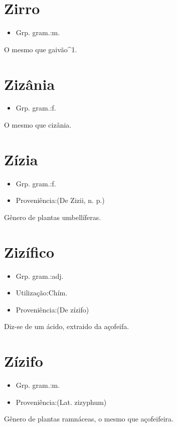\section{Zirro}
\begin{itemize}
\item {Grp. gram.:m.}
\end{itemize}
O mesmo que \textunderscore gaivão\textunderscore ^1.
\section{Zizânia}
\begin{itemize}
\item {Grp. gram.:f.}
\end{itemize}
O mesmo que \textunderscore cizânia\textunderscore .
\section{Zízia}
\begin{itemize}
\item {Grp. gram.:f.}
\end{itemize}
\begin{itemize}
\item {Proveniência:(De \textunderscore Zizii\textunderscore , n. p.)}
\end{itemize}
Gênero de plantas umbellíferas.
\section{Zizífico}
\begin{itemize}
\item {Grp. gram.:adj.}
\end{itemize}
\begin{itemize}
\item {Utilização:Chím.}
\end{itemize}
\begin{itemize}
\item {Proveniência:(De \textunderscore zízifo\textunderscore )}
\end{itemize}
Diz-se de um ácido, extraido da açofeifa.
\section{Zízifo}
\begin{itemize}
\item {Grp. gram.:m.}
\end{itemize}
\begin{itemize}
\item {Proveniência:(Lat. \textunderscore zizyphum\textunderscore )}
\end{itemize}
Gênero de plantas ramnáceas, o mesmo que \textunderscore açofeifeira\textunderscore .
